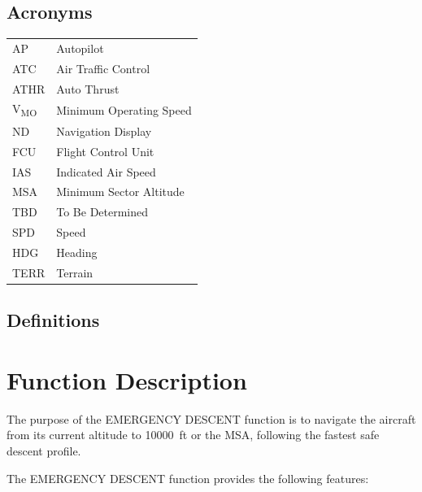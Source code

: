 \documentclass[12pt,oneside]{scrreprt}
\begin{document}
{
\renewcommand{\chapter}[2]{} %

\nocite{*}

}

\section{Acronyms}

\begin{table}[h]
	\label{tab:acronyms}
    \begin{tabularx}{\textwidth}{lX}
		AP & Autopilot \\
		ATC & Air Traffic Control \\
		ATHR & Auto Thrust \\
		V\textsubscript{MO} & Minimum Operating Speed \\
		ND & Navigation Display \\
		FCU & Flight Control Unit \\
		IAS & Indicated Air Speed \\
		MSA & Minimum Sector Altitude \\
		TBD & To Be Determined \\
		SPD & Speed \\
		HDG & Heading \\
		TERR & Terrain \\
	\end{tabularx}
\end{table}

\section{Definitions}

\chapter{Function Description}
\label{sec:FD}

The purpose of the EMERGENCY DESCENT function is to navigate the aircraft from its current altitude to \SI{10000}{ft} or the MSA, following the fastest safe descent profile.

The EMERGENCY DESCENT function provides the following features:
\end{document}
